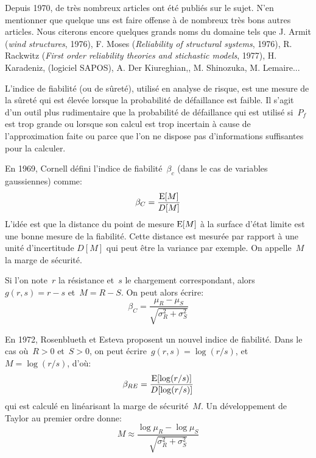 \begin{histoire}
Depuis 1970, de très nombreux articles ont été publiés sur le sujet. N'en mentionner que quelque uns est faire offense à de nombreux très bons autres articles. Nous citerons encore quelques grands noms du domaine tels que J. Armit (\emph{wind structures}, 1976), F. Moses (\emph{Reliability of structural systems}, 1976), R. Rackwitz (\emph{First order reliability theories and stichastic models}, 1977), H. Karadeniz, (logiciel SAPOS), A. Der Kiureghian,, M. Shinozuka, M. Lemaire...

\medskip
L'indice de fiabilité (ou de sûreté), utilisé en analyse de risque, est une mesure de la sûreté qui est élevée lorsque la probabilité de défaillance est faible.
Il s'agit d'un outil plus rudimentaire que la probabilité de défaillance qui est utilisé si~$P_f$ est trop grande ou lorsque son calcul est trop incertain à cause de l'approximation faite ou parce que l'on ne dispose pas d'informations suffisantes pour la calculer.

En 1969, Cornell défini l'indice de fiabilité~$\beta_c$ (dans le cas de variables gaussiennes) comme:
\begin{equation}
\beta_C=\dfrac{\operatorname{E}[M]}{D[M]}
\end{equation}
L'idée est que la distance du point de mesure $\operatorname{E}[M]$ à la surface d'état limite est une bonne mesure de la fiabilité. Cette distance est mesurée par rapport à une unité d'incertitude $D[M]$ qui peut être la variance par exemple. On appelle~$M$ la marge de sécurité.

Si l'on note~$r$ la résistance et~$s$ le chargement correspondant, alors~$g(r,s)=r-s$ et~$M=R-S$. On peut alors écrire:
$$\beta_C=\dfrac{\mu_R-\mu_S}{\sqrt{\sigma_R^2+\sigma_S^2}}$$

En 1972, Rosenblueth et Esteva proposent un nouvel indice de fiabilité. Dans le cas où~$R>0$ et~$S>0$, on peut écrire~$g(r,s)=\log(r/s)$, et~$M=\log(r/s)$, d'où:
\begin{equation}
\beta_{RE}=\dfrac{\operatorname{E}[\log(r/s)]}{D[\log(r/s)]}
\end{equation}
qui est calculé en linéarisant la marge de sécurité~$M$. Un développement de Taylor au premier ordre donne:
$$M\approx\dfrac{\log\mu_R-\log\mu_S}{\sqrt{\sigma_R^2+\sigma_S^2}}$$


\end{histoire}
